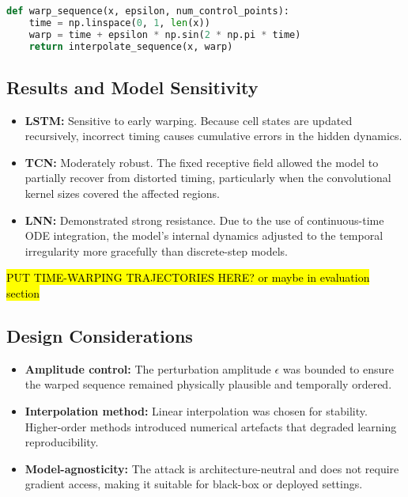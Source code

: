 \begin{lstlisting}[language=Python, caption={Example Time-Warping Attack Function}]
def warp_sequence(x, epsilon, num_control_points):
    time = np.linspace(0, 1, len(x))
    warp = time + epsilon * np.sin(2 * np.pi * time)
    return interpolate_sequence(x, warp)
\end{lstlisting}

\subsection{Results and Model Sensitivity}
\begin{itemize}
    \item \textbf{LSTM:} Sensitive to early warping. Because cell states are updated recursively, incorrect timing causes cumulative errors in the hidden dynamics.
    \item \textbf{TCN:} Moderately robust. The fixed receptive field allowed the model to partially recover from distorted timing, particularly when the convolutional kernel sizes covered the affected regions.
    \item \textbf{LNN:} Demonstrated strong resistance. Due to the use of continuous-time ODE integration, the model's internal dynamics adjusted to the temporal irregularity more gracefully than discrete-step models.
\end{itemize}

\hl{PUT TIME-WARPING TRAJECTORIES HERE? or maybe in evaluation section}



\subsection{Design Considerations}
\begin{itemize}
    \item \textbf{Amplitude control:} The perturbation amplitude $\epsilon$ was bounded to ensure the warped sequence remained physically plausible and temporally ordered.
    \item \textbf{Interpolation method:} Linear interpolation was chosen for stability. Higher-order methods introduced numerical artefacts that degraded learning reproducibility.
    \item \textbf{Model-agnosticity:} The attack is architecture-neutral and does not require gradient access, making it suitable for black-box or deployed settings.
\end{itemize}

